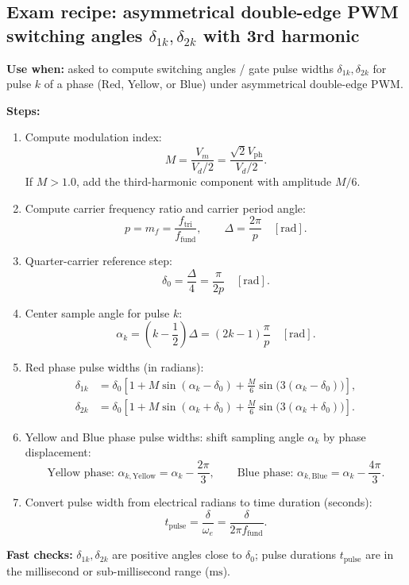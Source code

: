 \subsection{Exam recipe: asymmetrical double-edge PWM switching angles \texorpdfstring{$\delta_{1k}, \delta_{2k}$}{delta_1k, delta_2k} with 3rd harmonic}
\textbf{Use when:} asked to compute switching angles / gate pulse widths \(\delta_{1k}, \delta_{2k}\) for pulse \(k\) of a phase (Red, Yellow, or Blue) under asymmetrical double-edge PWM.

\textbf{Steps:}
\begin{enumerate}
  \item Compute modulation index:
  \[
  M = \frac{V_m}{V_d/2} = \frac{\sqrt{2} V_{\mathrm{ph}}}{V_d/2}.
  \]
  If \(M > 1.0\), add the third-harmonic component with amplitude \(M/6\).
  \item Compute carrier frequency ratio and carrier period angle:
  \[
  p = m_f = \frac{f_{\mathrm{tri}}}{f_{\mathrm{fund}}},
  \qquad
  \Delta = \frac{2\pi}{p} \quad [\mathrm{rad}].
  \]
  \item Quarter-carrier reference step:
  \[
  \delta_0 = \frac{\Delta}{4} = \frac{\pi}{2 p} \quad [\mathrm{rad}].
  \]
  \item Center sample angle for pulse \(k\):
  \[
  \alpha_k = \left(k - \frac{1}{2}\right)\Delta = (2k - 1)\frac{\pi}{p} \quad [\mathrm{rad}].
  \]
  \item Red phase pulse widths (in radians):
  \[
  \begin{aligned}
  \delta_{1k} &= \delta_0\left[1 + M\sin(\alpha_k - \delta_0) + \frac{M}{6}\sin\bigl(3(\alpha_k - \delta_0)\bigr)\right],\\
  \delta_{2k} &= \delta_0\left[1 + M\sin(\alpha_k + \delta_0) + \frac{M}{6}\sin\bigl(3(\alpha_k + \delta_0)\bigr)\right].
  \end{aligned}
  \]
  \item Yellow and Blue phase pulse widths: shift sampling angle \(\alpha_k\) by phase displacement:
  \[
  \text{Yellow phase: } \alpha_{k,\mathrm{Yellow}} = \alpha_k - \frac{2\pi}{3},
  \qquad
  \text{Blue phase: } \alpha_{k,\mathrm{Blue}} = \alpha_k - \frac{4\pi}{3}.
  \]
  \item Convert pulse width from electrical radians to time duration (seconds):
  \[
  t_{\mathrm{pulse}} = \frac{\delta}{\omega_e} = \frac{\delta}{2\pi f_{\mathrm{fund}}}.
  \]
\end{enumerate}

\textbf{Fast checks:} \(\delta_{1k}, \delta_{2k}\) are positive angles close to \(\delta_0\); pulse durations \(t_{\mathrm{pulse}}\) are in the millisecond or sub-millisecond range (\(\mathrm{ms}\)).

